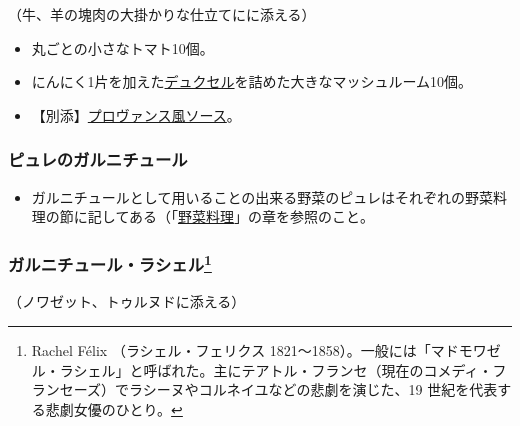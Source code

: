 \begin{recette}
（牛、羊の塊肉の大掛かりな仕立てにに添える）

\begin{itemize}
\item
  丸ごとの小さなトマト10個。
\item
  にんにく1片を加えた\protect\hyperlink{duxelles-seche}{デュクセル}を詰めた大きなマッシュルーム10個。
\item
  【別添】\protect\hyperlink{sauce-provencale}{プロヴァンス風ソース}。
\end{itemize}

\atoaki{}

\hypertarget{garniture-de-purees}{%
\subsubsection{ピュレのガルニチュール}\label{garniture-de-purees}}



\begin{itemize}
\tightlist
\item
  ガルニチュールとして用いることの出来る野菜のピュレはそれぞれの野菜料理の節に記してある（「\protect\hyperlink{legumes}{野菜料理}」の章を参照のこと。
\end{itemize}

\atoaki{}

\hypertarget{garniture-rachel}{%
\subsubsection[ガルニチュール・ラシェル]{\texorpdfstring{ガルニチュール・ラシェル\footnote{Rachel
  Félix （ラシェル・フェリクス
  1821〜1858）。一般には「マドモワゼル・ラシェル」と呼ばれた。主にテアトル・フランセ（現在のコメディ・フランセーズ）でラシーヌやコルネイユなどの悲劇を演じた、19
  世紀を代表する悲劇女優のひとり。}}{ガルニチュール・ラシェル}}\label{garniture-rachel}}



（ノワゼット、トゥルヌドに添える）


\end{recette}
